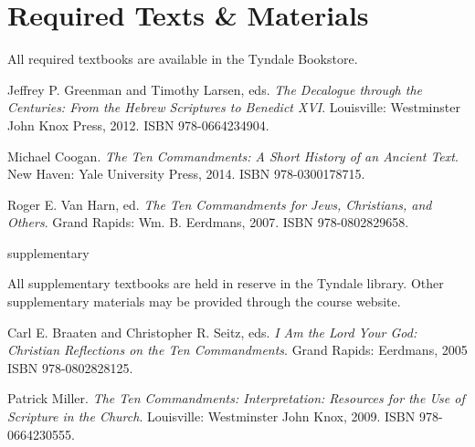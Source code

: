 \documentclass[titlepage]{article}
\newcommand\incl{../includes}
\begin{document}


\section{Required Texts \& Materials}
\label{texts}

All required textbooks are available in the Tyndale Bookstore.

\begingroup
\renewcommand{\section}[2]{}%
\begin{thebibliography}{3}%

	 Jeffrey P. Greenman and Timothy Larsen, eds.
	\emph{The Decalogue through the Centuries: From the Hebrew Scriptures to Benedict XVI}.
	Louisville: Westminster John Knox Press, 2012.
	ISBN 978-0664234904.

	 Michael Coogan.
    \emph{The Ten Commandments: A Short History of an Ancient Text}.
    New Haven: Yale University Press, 2014.
    ISBN 978-0300178715.

	 Roger E. Van Harn, ed.
	\emph{The Ten Commandments for Jews, Christians, and Others}.
	Grand Rapids: Wm. B. Eerdmans, 2007.
	ISBN 978-0802829658.

\end{thebibliography}
\endgroup

\section{Supplementary Texts}
\label{supplementary}

All supplementary textbooks are held in reserve in the Tyndale library.
Other supplementary materials may be provided through the course website.

\begingroup
\renewcommand{\section}[2]{}%
\begin{thebibliography}{3}%

	 Carl E. Braaten and Christopher R. Seitz, eds.
	\emph{I Am the Lord Your God: Christian Reflections on the Ten Commandments}.
	Grand Rapids: Eerdmans, 2005
	ISBN 978-0802828125.

	 Patrick Miller.
    \emph{The Ten Commandments: Interpretation: Resources for the Use of Scripture in the Church}.
    Louisville: Westminster John Knox, 2009.
    ISBN 978-0664230555.

\end{thebibliography}
\endgroup
\end{document}
